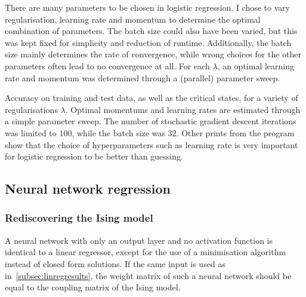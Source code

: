 \documentclass[11pt,british,a4paper]{article}
\numberwithin{equation}{section}
\begin{document}
There are many parameters to be chosen in logistic regression. I chose to vary regularisation, learning rate and momentum to determine the optimal combination of parameters. The batch size could also have been varied, but this was kept fixed for simplicity and reduction of runtime. Additionally, the batch size mainly determines the rate of convergence, while wrong choices for the other parameters often lead to no convergence at all. For each \(\lambda\), an optimal learning rate and momentum was determined through a (parallel) parameter sweep.

\begin{table}[H]
    \centering
    \caption{Accuracy on training and test data, as well as the critical states, for a variety of regularisations \(\lambda\). Optimal momentums and learning rates are estimated through a simple parameter sweep. The number of stochastic gradient descent iterations was limited to \(100\), while the batch size was \(32\). Other prints from the program show that the choice of hyperparameters such as learning rate is very important for logistic regression to be better than guessing.}
\end{table}

\subsection{Neural network regression}
\subsubsection{Rediscovering the Ising model}
A neural network with only an output layer and no activation function is identical to a linear regressor, except for the use of a minimisation algorithm instead of closed form solutions.
If the same input is used as in~\vref{subsec:linregresults}, the weight matrix of such a neural network should be equal to the coupling matrix of the Ising model.
\end{document}
